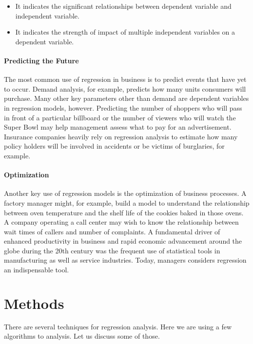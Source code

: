 \documentclass[11pt, a4paper]{report}
\begin{document}
\begin{itemize}
	\item It indicates the significant relationships between dependent variable and independent variable.
	
	\item It indicates the strength of impact of multiple independent variables on a dependent variable.
\end{itemize}

\subsubsection{Predicting the Future}
The most common use of regression in business is to predict events that have yet to occur. Demand analysis, for example, predicts how many units consumers will purchase. Many other key parameters other than demand are dependent variables in regression models, however. Predicting the number of shoppers who will pass in front of a particular billboard or the number of viewers who will watch the Super Bowl may help management assess what to pay for an advertisement. Insurance companies heavily rely on regression analysis to estimate how many policy holders will be involved in accidents or be victims of burglaries, for example. \cite{desc:RegressionApplication}

\subsubsection{Optimization}
Another key use of regression models is the optimization of business processes. A factory manager might, for example, build a model to understand the relationship between oven temperature and the shelf life of the cookies baked in those ovens. A company operating a call center may wish to know the relationship between wait times of callers and number of complaints. A fundamental driver of enhanced productivity in business and rapid economic advancement around the globe during the 20th century was the frequent use of statistical tools in manufacturing as well as service industries. Today, managers considers regression an indispensable tool. \cite{desc:RegressionApplication}


\newpage
\chapter{Methods}
There are several techniques for regression analysis. Here we are using a few algorithms to analysis. Let us discuss some of those.
\end{document}
